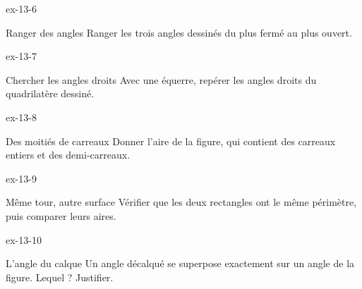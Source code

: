 \begin{blocLivre}{ex-13-6}\begin{exercice}[2]{Ranger des angles}
Ranger les trois angles dessinés du plus fermé au plus ouvert.
\label{fig-ex-13-6}
\end{exercice}\end{blocLivre}
\begin{blocLivre}{ex-13-7}\begin{exercice}[2]{Chercher les angles droits}
Avec une équerre, repérer les angles droits du quadrilatère dessiné.
\label{fig-ex-13-7}
\end{exercice}\end{blocLivre}
\begin{blocLivre}{ex-13-8}\begin{exercice}[2]{Des moitiés de carreaux}
Donner l’aire de la figure, qui contient des carreaux entiers et des demi-carreaux.
\label{fig-ex-13-8}
\end{exercice}\end{blocLivre}
\begin{blocLivre}{ex-13-9}\begin{exercice}[2]{Même tour, autre surface}
Vérifier que les deux rectangles ont le même périmètre, puis comparer leurs aires.
\label{fig-ex-13-9}
\end{exercice}\end{blocLivre}
\begin{blocLivre}{ex-13-10}\begin{exercice}[2]{L’angle du calque}
Un angle décalqué se superpose exactement sur un angle de la figure. Lequel ? Justifier.
\label{fig-ex-13-10}
\end{exercice}\end{blocLivre}

